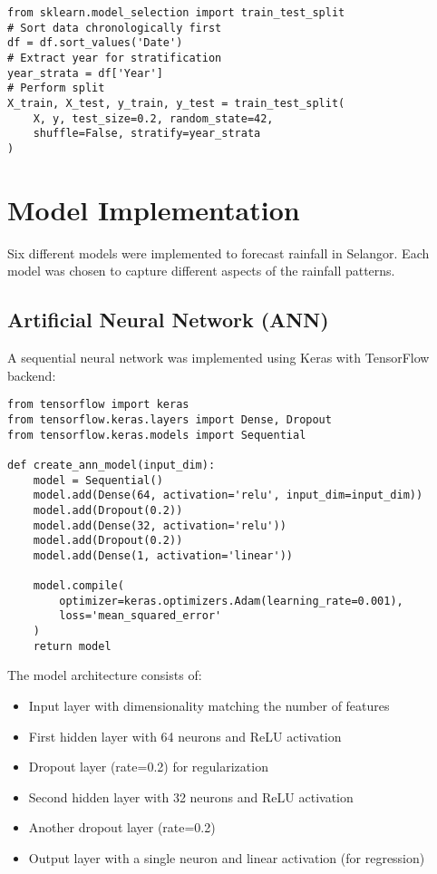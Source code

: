 \documentclass[12pt]{article}
\begin{document}
\begin{verbatim}
from sklearn.model_selection import train_test_split
# Sort data chronologically first
df = df.sort_values('Date')
# Extract year for stratification
year_strata = df['Year']
# Perform split
X_train, X_test, y_train, y_test = train_test_split(
    X, y, test_size=0.2, random_state=42, 
    shuffle=False, stratify=year_strata
)
\end{verbatim}

\section{Model Implementation}
\label{sec:model_implementation}

Six different models were implemented to forecast rainfall in Selangor. Each model was chosen to capture different aspects of the rainfall patterns.

\subsection{Artificial Neural Network (ANN)}
\label{subsec:ann}

A sequential neural network was implemented using Keras with TensorFlow backend:

\begin{verbatim}
from tensorflow import keras
from tensorflow.keras.layers import Dense, Dropout
from tensorflow.keras.models import Sequential

def create_ann_model(input_dim):
    model = Sequential()
    model.add(Dense(64, activation='relu', input_dim=input_dim))
    model.add(Dropout(0.2))
    model.add(Dense(32, activation='relu'))
    model.add(Dropout(0.2))
    model.add(Dense(1, activation='linear'))
    
    model.compile(
        optimizer=keras.optimizers.Adam(learning_rate=0.001),
        loss='mean_squared_error'
    )
    return model
\end{verbatim}

The model architecture consists of:
\begin{itemize}
    \item Input layer with dimensionality matching the number of features
    \item First hidden layer with 64 neurons and ReLU activation
    \item Dropout layer (rate=0.2) for regularization
    \item Second hidden layer with 32 neurons and ReLU activation
    \item Another dropout layer (rate=0.2)
    \item Output layer with a single neuron and linear activation (for regression)
\end{itemize}
\end{document}
